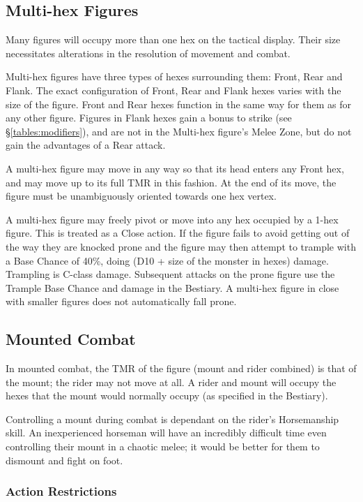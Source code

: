 \begin{multicols*}{3}
\subsection{Multi-hex Figures}

Many figures will occupy more than one hex on the tactical
display. Their size necessitates alterations in the resolution of
movement and combat.

Multi-hex figures have three types of hexes surrounding them: Front,
Rear and Flank. The exact configuration of Front, Rear and Flank hexes
varies with the size of the figure. Front and Rear hexes function in
the same way for them as for any other figure. Figures in Flank hexes
gain a bonus to strike (see \S \ref{tables:modifiers}), and are not in
the Multi-hex figure's Melee Zone, but do not gain the advantages of a
Rear attack.

A multi-hex figure may move in any way so that its head enters any
Front hex, and may move up to its full TMR in this fashion. At the end
of its move, the figure must be unambiguously oriented towards one hex
vertex.

A multi-hex figure may freely pivot or move into any hex occupied by a
1-hex figure. This is treated as a Close action.  If the figure fails
to avoid getting out of the way they are knocked prone and the figure
may then attempt to trample with a Base Chance of 40\%, doing (D10 +
size of the monster in hexes) damage. Trampling is C-class
damage. Subsequent attacks on the prone figure use the Trample Base
Chance and damage in the Bestiary. A multi-hex figure in close with
smaller figures does not automatically fall prone.

\subsection{Mounted Combat}

In mounted combat, the TMR of the figure (mount and rider combined) is
that of the mount; the rider may not move at all. A rider and mount
will occupy the hexes that the mount would normally occupy (as
specified in the Bestiary).

Controlling a mount during combat is dependant on the rider's
Horsemanship skill. An inexperienced horseman will have an incredibly
difficult time even controlling their mount in a chaotic melee; it
would be better for them to dismount and fight on foot.

\subsubsection{Action Restrictions}


\end{multicols*}
